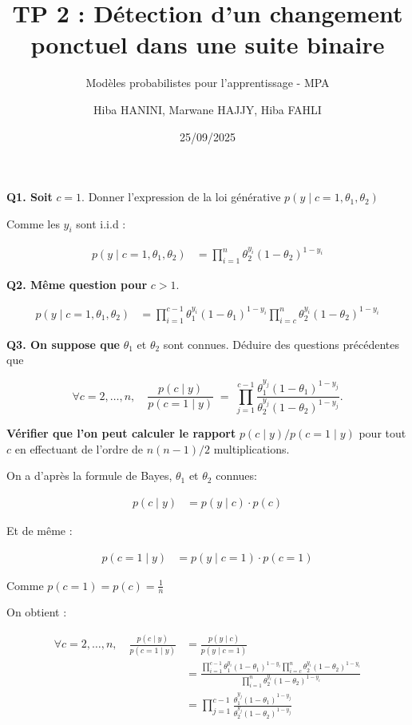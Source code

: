 \documentclass[
]{article}
\title{TP 2 : Détection d'un changement ponctuel dans une suite binaire}
\subtitle{Modèles probabilistes pour l'apprentissage - MPA}
\author{Hiba HANINI, Marwane HAJJY, Hiba FAHLI}
\date{25/09/2025}
\begin{document}
\maketitle

\textbf{Q1. Soit} \(c = 1\). Donner l'expression de la loi générative
\(p(y \mid c = 1, \theta_1, \theta_2)\)

Comme les \(y_i\) sont i.i.d :

\[
\begin{aligned}
p(y \mid c = 1, \theta_1, \theta_2) &= \prod_{i=1}^n \theta_2^{y_i} (1 - \theta_2)^{1 - y_i}
\end{aligned}
\]

\textbf{Q2. Même question pour} \(c > 1\).

\[
\begin{aligned}
p(y \mid c = 1, \theta_1, \theta_2) &= \prod_{i=1}^{c-1} \theta_1^{y_i} (1 - \theta_1)^{1 - y_i} \prod_{i=c}^{n} \theta_2^{y_i} (1 - \theta_2)^{1 - y_i} 
\end{aligned}
\]

\textbf{Q3. On suppose que} \(\theta_1\) et \(\theta_2\) sont connues.
Déduire des questions précédentes que

\[
\forall c = 2, \ldots, n, \quad
\frac{p(c \mid y)}{p(c = 1 \mid y)} \;=\;
\prod_{j=1}^{c-1}
\frac{\theta_1^{y_j}(1 - \theta_1)^{1-y_j}}{\theta_2^{y_j}(1 - \theta_2)^{1-y_j}}.
\]

\textbf{Vérifier que l'on peut calculer le rapport}
\(p(c \mid y)/p(c = 1 \mid y)\) pour tout \(c\) en effectuant de l'ordre
de \(n(n - 1)/2\) multiplications.

On a d'après la formule de Bayes, \(\theta_1\) et \(\theta_2\) connues:

\[
\begin{aligned}
p(c \mid y) &= p(y \mid c) \cdot p(c)
\end{aligned}
\]

Et de même :

\[
\begin{aligned}
p(c = 1 \mid y) &= p(y \mid c = 1) \cdot p(c = 1)
\end{aligned}
\]

Comme \(p(c = 1) = p(c) = \frac{1}{n}\)

On obtient :

\[
\begin{aligned}
\forall c = 2, \ldots, n, \quad
\frac{p(c \mid y)}{p(c = 1 \mid y)} &= \frac{p(y \mid c)}{p(y \mid c = 1)} \\
&= \frac{\prod_{i=1}^{c-1} \theta_1^{y_i} (1 - \theta_1)^{1 - y_i} \prod_{i=c}^{n} \theta_2^{y_i} (1 - \theta_2)^{1 - y_i}}{\prod_{i=1}^n \theta_2^{y_i} (1 - \theta_2)^{1 - y_i}} \\
&= \prod_{j=1}^{c-1} \frac{\theta_1^{y_j}(1 - \theta_1)^{1-y_j}}{\theta_2^{y_j}(1 - \theta_2)^{1-y_j}}
\end{aligned}
\]
\end{document}
